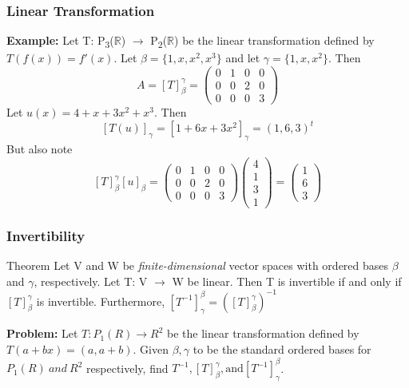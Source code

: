 \documentclass[11pt]{beamer}
\begin{document}
\begin{frame}
	\frametitle{Linear Transformation}
	\textbf{Example: } Let T: P\textsubscript{3}($ \mathbb{R} $) $\rightarrow$ P\textsubscript{2}($ \mathbb{R} $) be the linear transformation defined by $T(f(x)) = f'(x)$. Let $\beta = \{1, x, x^2, x^3\}$ and let $\gamma = \{1, x, x^2\}$. Then
	\[A = \left[T \right]_{\beta}^{\gamma}  =  
	\begin{pmatrix}
		0 & 1 & 0 & 0 \\
		0 & 0 & 2 & 0 \\
		0 & 0 & 0 & 3
	\end{pmatrix} \]
Let $u(x) = 4 + x + 3x^2 + x^3$. Then
	\[ \left[T(u) \right]_{\gamma}  = \left[ 1 + 6x + 3x^2 \right]_{\gamma} = (1,6,3)^{t} \]
	But also note
	\[ \left[ T \right]_{\beta}^{\gamma} \left[ u \right]_{\beta}  = 
	\begin{pmatrix}
		0 & 1 & 0 & 0 \\
		0 & 0 & 2 & 0 \\
		0 & 0 & 0 & 3
	\end{pmatrix}
	\begin{pmatrix}
		4 \\
		1 \\
		3 \\
		1
	\end{pmatrix} = 
	\begin{pmatrix}
		1 \\
		6 \\
		3
	\end{pmatrix}
\]
\end{frame}

\begin{frame}
	\frametitle{Invertibility}
	\begin{block}{Theorem}
		Let V and W be \textit{finite-dimensional} vector spaces with ordered bases $\beta$ and $\gamma$, respectively. Let T: V $\rightarrow$ W be linear. Then T is invertible if and only if $\left[T\right]_{\beta}^{\gamma}$ is invertible. Furthermore, $\left[T^{-1}\right]_{\gamma}^{\beta} = (\left[ T\right]_{\beta}^{\gamma})^{-1}$
	\end{block}

	\phantom{}
	
	\textbf{Problem:} Let $T: P_{1}(R) \rightarrow R^{2}$ be the linear transformation defined by $T(a + bx) = (a, a+b)$. Given $\beta, \gamma$ to be the standard ordered bases for $P_{1}(R) \ and \ R^{2}$ respectively, find $T^{-1}, \left[ T\right]_{\beta}^{\gamma}, \text{and} \left[ T^{-1} \right]_{\gamma}^{\beta}$.
\end{frame}
\end{document}
